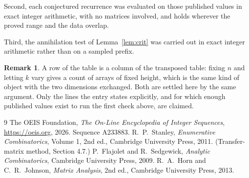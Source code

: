\documentclass[11pt,a4paper]{article}
\theoremstyle{plain}
\theoremstyle{definition}
\newtheorem{remark}[theorem]{Remark}
\begin{document}
Second, each conjectured recurrence was evaluated on those published values in exact
integer arithmetic, with no matrices involved, and holds wherever the proved range and the
data overlap.

Third, the annihilation test of Lemma~\ref{lem:crit} was carried out in exact integer
arithmetic rather than on a sampled prefix.

\begin{remark}
A row of the table is a column of the transposed table: fixing $n$ and letting $k$ vary gives a
count of arrays of fixed height, which is the same kind of object with the two dimensions
exchanged. Both are settled here by the same argument. Only the lines the entry states
explicitly, and for which enough published values exist to run the first check above, are
claimed.
\end{remark}

\begin{thebibliography}{9}
 The OEIS Foundation, \emph{The On-Line Encyclopedia of Integer
Sequences}, \url{https://oeis.org}, 2026. Sequence A233883.
 R.~P.~Stanley, \emph{Enumerative Combinatorics}, Volume 1, 2nd ed.,
Cambridge University Press, 2011. (Transfer-matrix method, Section 4.7.)
 P.~Flajolet and R.~Sedgewick, \emph{Analytic Combinatorics}, Cambridge
University Press, 2009.
 R.~A.~Horn and C.~R.~Johnson, \emph{Matrix Analysis}, 2nd ed., Cambridge
University Press, 2013.
\end{thebibliography}
\end{document}
